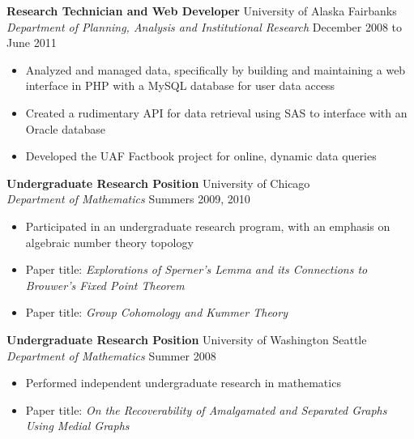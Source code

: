 \documentclass{article}
\begin{document}
\begin{flushleft}
\hspace{20pt}
\textbf{Research Technician and Web Developer} \hfill University of Alaska Fairbanks\\
\hspace{20pt}
\textit{Department of Planning, Analysis and Institutional Research} \hfill December 2008 to June 2011\\
\begin{itemize}[leftmargin=50pt,itemsep=-2pt]
\item Analyzed and managed data, specifically by building and maintaining a web interface in PHP with a MySQL database for user data access
\item Created a rudimentary API for data retrieval using SAS to interface with an Oracle database
\item Developed the UAF Factbook project for online, dynamic data queries
\end{itemize}
 
\hspace{20pt}
\textbf{Undergraduate Research Position} \hfill University of Chicago\\
\hspace{20pt}
\textit{Department of Mathematics} \hfill Summers 2009, 2010\\
\begin{itemize}[leftmargin=50pt,itemsep=-2pt]
\item Participated in an undergraduate research program, with an emphasis on algebraic number theory topology
\item Paper title: \textit{Explorations of Sperner's Lemma and its Connections to Brouwer's Fixed Point Theorem}
\item Paper title: \textit{Group Cohomology and Kummer Theory}
\end{itemize}

\hspace{20pt}
\textbf{Undergraduate Research Position} \hfill University of Washington Seattle\\
\hspace{20pt}
\textit{Department of Mathematics} \hfill Summer 2008\\
\begin{itemize}[leftmargin=50pt,itemsep=-2pt]
\item Performed independent undergraduate research in mathematics
\item Paper title: \textit{On the Recoverability of Amalgamated and Separated Graphs Using Medial Graphs}
\end{itemize}


\end{flushleft}
\end{document}
